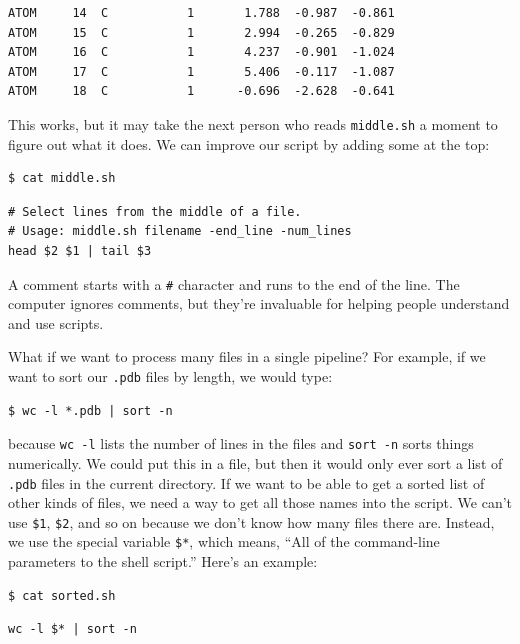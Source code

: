 \documentclass{book}
\begin{document}
\begin{verbatim}
ATOM     14  C           1       1.788  -0.987  -0.861
ATOM     15  C           1       2.994  -0.265  -0.829
ATOM     16  C           1       4.237  -0.901  -1.024
ATOM     17  C           1       5.406  -0.117  -1.087
ATOM     18  C           1      -0.696  -2.628  -0.641
\end{verbatim}

This works, but it may take the next person who reads \texttt{middle.sh}
a moment to figure out what it does. We can improve our script by adding
some  at the top:

\begin{verbatim}
$ cat middle.sh
\end{verbatim}

\begin{verbatim}
# Select lines from the middle of a file.
# Usage: middle.sh filename -end_line -num_lines
head $2 $1 | tail $3
\end{verbatim}

A comment starts with a \texttt{\#} character and runs to the end of the
line. The computer ignores comments, but they're invaluable for helping
people understand and use scripts.

What if we want to process many files in a single pipeline? For example,
if we want to sort our \texttt{.pdb} files by length, we would type:

\begin{verbatim}
$ wc -l *.pdb | sort -n
\end{verbatim}

because \texttt{wc -l} lists the number of lines in the files and
\texttt{sort -n} sorts things numerically. We could put this in a file,
but then it would only ever sort a list of \texttt{.pdb} files in the
current directory. If we want to be able to get a sorted list of other
kinds of files, we need a way to get all those names into the script. We
can't use \texttt{\$1}, \texttt{\$2}, and so on because we don't know
how many files there are. Instead, we use the special variable
\texttt{\$*}, which means, ``All of the command-line parameters to the
shell script.'' Here's an example:

\begin{verbatim}
$ cat sorted.sh
\end{verbatim}

\begin{verbatim}
wc -l $* | sort -n
\end{verbatim}
\end{document}
